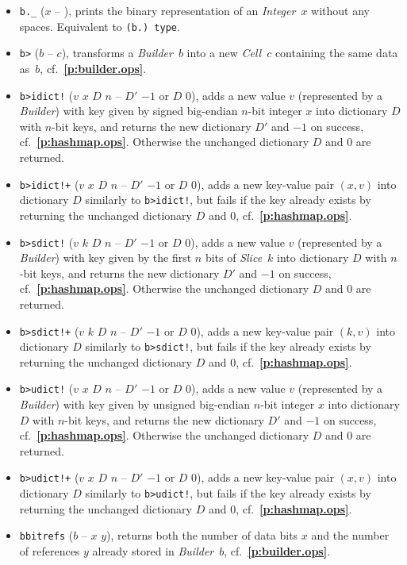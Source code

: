 \documentclass[12pt,oneside]{article}
\def\refpoint#1{{\rm\textbf{\ref{#1}}}}
\let\ptref=\refpoint
\begin{document}
\begin{itemize}
\item {\tt b.\_} ($x$ -- ), prints the binary representation of an {\em Integer\/}~$x$ without any spaces. Equivalent to {\tt (b.)~type}.
\item {\tt b>} ($b$ -- $c$), transforms a {\em Builder\/}~$b$ into a new {\em Cell\/}~$c$ containing the same data as~$b$, cf.~\ptref{p:builder.ops}.
\item {\tt b>idict!} ($v$ $x$ $D$ $n$ -- $D'$ $-1$ or $D$ $0$), adds a new value $v$ (represented by a {\em Builder}) with key given by signed big-endian $n$-bit integer $x$ into dictionary $D$ with $n$-bit keys, and returns the new dictionary $D'$ and $-1$ on success, cf.~\ptref{p:hashmap.ops}. Otherwise the unchanged dictionary $D$ and $0$ are returned.
\item {\tt b>idict!+} ($v$ $x$ $D$ $n$ -- $D'$ $-1$ or $D$ $0$), adds a new key-value pair $(x,v)$ into dictionary $D$ similarly to {\tt b>idict!}, but fails if the key already exists by returning the unchanged dictionary $D$ and $0$, cf.~\ptref{p:hashmap.ops}.
\item {\tt b>sdict!} ($v$ $k$ $D$ $n$ -- $D'$ $-1$ or $D$ $0$), adds a new value $v$ (represented by a {\em Builder}) with key given by the first $n$ bits of {\em Slice\/}~$k$ into dictionary $D$ with $n$-bit keys, and returns the new dictionary $D'$ and $-1$ on success, cf.~\ptref{p:hashmap.ops}. Otherwise the unchanged dictionary $D$ and $0$ are returned.
\item {\tt b>sdict!+} ($v$ $k$ $D$ $n$ -- $D'$ $-1$ or $D$ $0$), adds a new key-value pair $(k,v)$ into dictionary $D$ similarly to {\tt b>sdict!}, but fails if the key already exists by returning the unchanged dictionary $D$ and $0$, cf.~\ptref{p:hashmap.ops}.
\item {\tt b>udict!} ($v$ $x$ $D$ $n$ -- $D'$ $-1$ or $D$ $0$), adds a new value $v$ (represented by a {\em Builder}) with key given by unsigned big-endian $n$-bit integer $x$ into dictionary $D$ with $n$-bit keys, and returns the new dictionary $D'$ and $-1$ on success, cf.~\ptref{p:hashmap.ops}. Otherwise the unchanged dictionary $D$ and $0$ are returned.
\item {\tt b>udict!+} ($v$ $x$ $D$ $n$ -- $D'$ $-1$ or $D$ $0$), adds a new key-value pair $(x,v)$ into dictionary $D$ similarly to {\tt b>udict!}, but fails if the key already exists by returning the unchanged dictionary $D$ and $0$, cf.~\ptref{p:hashmap.ops}.
\item {\tt bbitrefs} ($b$ -- $x$ $y$), returns both the number of data bits $x$ and the number of references $y$ already stored in {\em Builder\/}~$b$, cf.~\ptref{p:builder.ops}.

\end{itemize}
\end{document}
